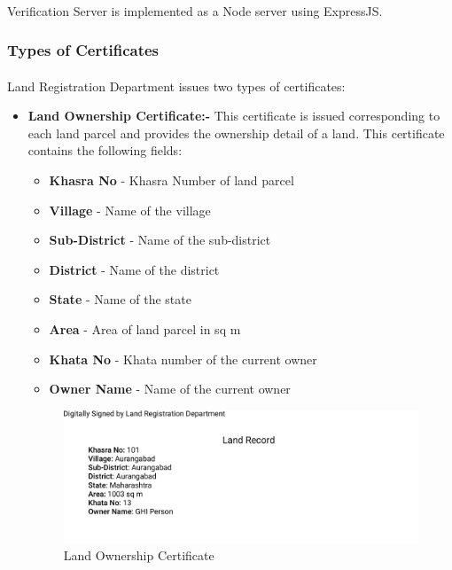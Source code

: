 \documentclass[12pt]{article}
\begin{document}
        \paragraph{}
        Verification Server is implemented as a Node server using ExpressJS.
        
        \subsubsection{Types of Certificates}
        \paragraph{}
        Land Registration Department issues two types of certificates:
        \begin{itemize}
            \item \textbf{Land Ownership Certificate:-} This certificate is issued corresponding to each land parcel and provides the ownership detail of a land. This certificate contains the following fields:
             \begin{itemize}
                \item \textbf{Khasra No} - Khasra Number of land parcel
                \item \textbf{Village} - Name of the village
                \item \textbf{Sub-District} - Name of the sub-district 
                \item \textbf{District} - Name of the district
                \item \textbf{State} - Name of the state
                \item \textbf{Area} - Area of land parcel in sq m
                \item \textbf{Khata No} - Khata number of the current owner
                \item \textbf{Owner Name} - Name of the current owner
            \end{itemize}
            \begin{figure}[H]
                \includegraphics[scale=0.3, frame]{landcertificate.png}
                \centering
                \caption{Land Ownership Certificate}
            \end{figure}


\end{itemize}
\end{document}
